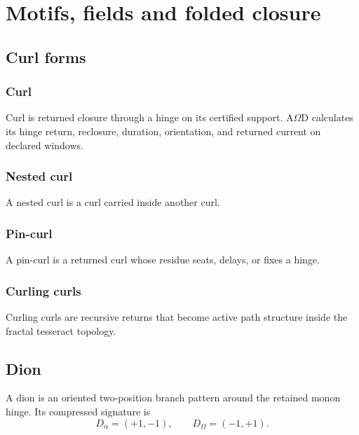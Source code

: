 \section{Motifs, fields and folded closure}
\label{sec:motif-field-folding}
\label{sec:curl-closure-duon-current}
\subsection{Curl forms}
\label{subsec:curl-closure}
\subsubsection{Curl}
\label{subsec:curl}
\begin{definition}
Curl is returned closure through a hinge on its certified support. A\(\Omega\)D calculates its hinge return, reclosure, duration, orientation, and returned current on declared windows.
\end{definition}

\subsubsection{Nested curl}
\label{subsec:nested-curl}
\begin{definition}
A nested curl is a curl carried inside another curl.
\end{definition}

\subsubsection{Pin-curl}
\label{subsec:pin-curl}
\begin{definition}
A pin-curl is a returned curl whose residue seats, delays, or fixes a hinge.
\end{definition}

\subsubsection{Curling curls}
\label{subsec:curling-curls}
\begin{definition}
Curling curls are recursive returns that become active path structure inside the fractal tesseract topology.
\end{definition}

\subsection{Dion}
\label{subsec:dion}
\begin{definition}
A dion is an oriented two-position branch pattern around the retained monon hinge. Its compressed signature is
\[
D_\alpha=(+1,-1),\qquad D_\Omega=(-1,+1).
\]
\end{definition}

